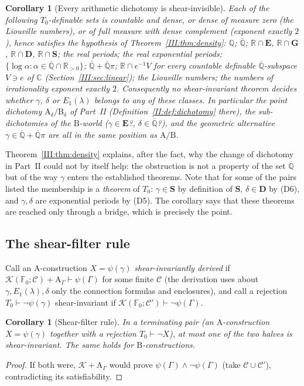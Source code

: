 \documentclass[11pt,a4paper]{article}
\newcommand{\Q}{\mathbb Q}
\newcommand{\R}{\mathbb R}
\newcommand{\C}{\mathbb C}
\newcommand{\Qbar}{\overline{\mathbb Q}}
\newcommand{\EE}{\mathbf E}
\newcommand{\GG}{\mathbf G}
\newcommand{\DD}{\mathbf D}
\newcommand{\Sring}{\mathbf S}
\newcommand{\Fld}{\mathbb F}
\newcommand{\Th}{\mathcal K}
\newcommand{\Tz}{T_0}
\newtheorem{corollary}[theorem]{Corollary}
\theoremstyle{definition}
\theoremstyle{remark}
\numberwithin{equation}{section}
\begin{document}
\begin{corollary}[Every arithmetic dichotomy is shear-invisible]\label{III:cor:invisible}
Each of the following $\Tz$-definable sets is countable and dense, or dense of measure
zero (the Liouville numbers), or of full measure with dense complement (exponent exactly
$2$), hence satisfies the hypothesis of Theorem~\ref{III:thm:density}: $\Q$; $\Qbar$;
$\R\cap\EE$, $\R\cap\GG$, $\R\cap\DD$, $\R\cap\Sring$; the real periods; the real
exponential periods; $\{\log\alpha:\alpha\in\Qbar\cap\R_{>0}\}$; $\Qbar+\Qbar\pi$;
$\R\cap e^{-1}V$ for every countable definable $\Qbar$-subspace $V\ni e$ of $\C$
(Section~\ref{III:sec:linear});
the Liouville numbers; the numbers of irrationality exponent exactly $2$. Consequently no
shear-invariant theorem decides whether $\gamma$, $\delta$ or $E_1(\lambda)$ belongs to
any of these classes. In particular the point dichotomy $\mathrm A_\delta/\mathrm B_\delta$
of Part~II (Definition~\ref{II:def:dichotomy} there), the sub-dichotomies of the $\mathrm B$-world
($\gamma\in\EE$?, $\delta\in\Qbar$?), and the geometric alternative
$\gamma\in\Qbar+\Qbar\pi$ are all in the same position as $\mathrm A/\mathrm B$.
\end{corollary}

Theorem~\ref{III:thm:density} explains, after the fact, why the change of dichotomy in
Part~II could not by itself help: the obstruction is not a property of the set $\Qbar$
but of the way $\gamma$ enters the established theorems. Note that for some of the pairs
listed the membership is a \emph{theorem} of $\Tz$: $\gamma\in\Sring$ by definition of
$\Sring$, $\delta\in\DD$ by (D6), and $\gamma,\delta$ are exponential periods by (D5).
The corollary says that these theorems are reached only through a bridge, which is
precisely the point.

\subsection{The shear-filter rule}

Call an $\mathrm A$-construction $X=\psi(\gamma)$ \emph{shear-invariantly derived} if
$\Th(\Fld_0;\mathcal C)+\mathrm A_\Gamma\vdash\psi(\Gamma)$ for some finite $\mathcal C$
(the derivation uses about $\gamma,E_1(\lambda),\delta$ only the connection formulas
and enclosures), and call a rejection $\Tz\vdash\neg\psi(\gamma)$ shear-invariant if
$\Th(\Fld_0;\mathcal C')\vdash\neg\psi(\Gamma)$.

\begin{corollary}[Shear-filter rule]\label{III:cor:filter}
In a terminating pair (an $\mathrm A$-construction $X=\psi(\gamma)$ together with a
rejection $\Tz\vdash\neg X$), at most one of the two halves is shear-invariant. The same
holds for $\mathrm B$-constructions.
\end{corollary}
\begin{proof}
If both were, $\Th+\mathrm A_\Gamma$ would prove $\psi(\Gamma)\wedge\neg\psi(\Gamma)$
(take $\mathcal C\cup\mathcal C'$), contradicting its satisfiability.
\end{proof}
\end{document}
